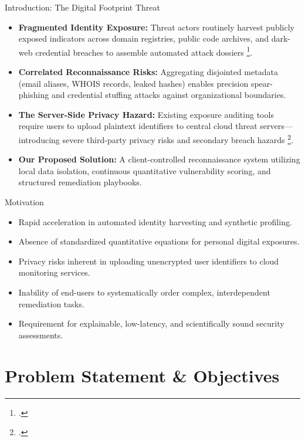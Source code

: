 \documentclass[aspectratio=169,10pt]{beamer}
\begin{document}
\begin{frame}{Introduction: The Digital Footprint Threat}
  \small
  \begin{itemize}\setlength{\itemsep}{0.30cm}
    \item \textbf{Fragmented Identity Exposure:} Threat actors routinely harvest publicly exposed indicators across domain registries, public code archives, and dark-web credential breaches to assemble automated attack dossiers \footcite{owasp2021, ieee2024osintrecon}.
    \item \textbf{Correlated Reconnaissance Risks:} Aggregating disjointed metadata (email aliases, WHOIS records, leaked hashes) enables precision spear-phishing and credential stuffing attacks against organizational boundaries.
    \item \textbf{The Server-Side Privacy Hazard:} Existing exposure auditing tools require users to upload plaintext identifiers to central cloud threat servers—introducing severe third-party privacy risks and secondary breach hazards \footcite{NIST_SP_800_63B}.
    \item \textbf{Our Proposed Solution:} A client-controlled reconnaissance system utilizing local data isolation, continuous quantitative vulnerability scoring, and structured remediation playbooks.
  \end{itemize}
\end{frame}

\begin{frame}{Motivation}
  \large
  \vspace{0.2cm}
  \begin{itemize}\setlength{\itemsep}{0.45cm}
    \item Rapid acceleration in automated identity harvesting and synthetic profiling.
    \item Absence of standardized quantitative equations for personal digital exposures.
    \item Privacy risks inherent in uploading unencrypted user identifiers to cloud monitoring services.
    \item Inability of end-users to systematically order complex, interdependent remediation tasks.
    \item Requirement for explainable, low-latency, and scientifically sound security assessments.
  \end{itemize}
\end{frame}

\section{Problem Statement \& Objectives}
\end{document}
